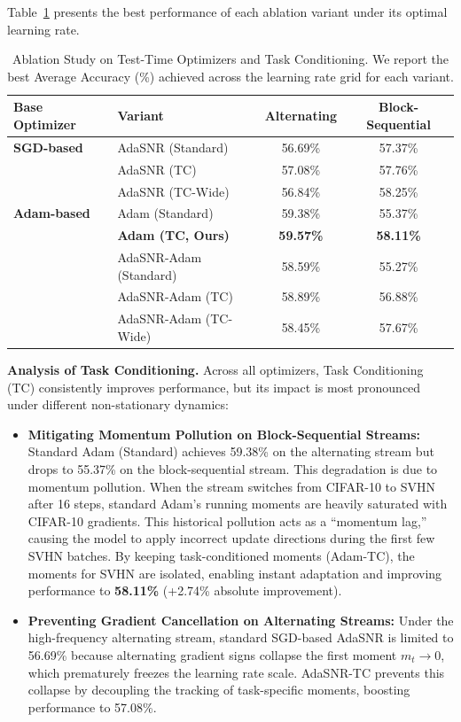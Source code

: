 \documentclass{article}
\theoremstyle{plain}
\theoremstyle{definition}
\theoremstyle{remark}
\begin{document}
Table~\ref{tab:ablation} presents the best performance of each ablation variant under its optimal learning rate.

\begin{table}[t]
\caption{Ablation Study on Test-Time Optimizers and Task Conditioning. We report the best Average Accuracy (\%) achieved across the learning rate grid for each variant.}
\label{tab:ablation}
\vskip 0.15in
\begin{center}
\begin{small}
\begin{tabular}{llcc}
\toprule
\textbf{Base Optimizer} & \textbf{Variant} & \textbf{Alternating} & \textbf{Block-Sequential} \\
\midrule
\textbf{SGD-based} & AdaSNR (Standard) & 56.69\% & 57.37\% \\
 & AdaSNR (TC) & 57.08\% & 57.76\% \\
 & AdaSNR (TC-Wide) & 56.84\% & 58.25\% \\
\midrule
\textbf{Adam-based} & Adam (Standard) & 59.38\% & 55.37\% \\
 & \textbf{Adam (TC, Ours)} & \textbf{59.57\%} & \textbf{58.11\%} \\
 & AdaSNR-Adam (Standard) & 58.59\% & 55.27\% \\
 & AdaSNR-Adam (TC) & 58.89\% & 56.88\% \\
 & AdaSNR-Adam (TC-Wide) & 58.45\% & 57.67\% \\
\bottomrule
\end{tabular}
\end{small}
\end{center}
\vskip -0.1in
\end{table}

\textbf{Analysis of Task Conditioning.} Across all optimizers, Task Conditioning (TC) consistently improves performance, but its impact is most pronounced under different non-stationary dynamics:
\begin{itemize}
    \item \textbf{Mitigating Momentum Pollution on Block-Sequential Streams:} Standard Adam (Standard) achieves 59.38\% on the alternating stream but drops to 55.37\% on the block-sequential stream. This degradation is due to momentum pollution. When the stream switches from CIFAR-10 to SVHN after 16 steps, standard Adam's running moments are heavily saturated with CIFAR-10 gradients. This historical pollution acts as a ``momentum lag,'' causing the model to apply incorrect update directions during the first few SVHN batches. By keeping task-conditioned moments (Adam-TC), the moments for SVHN are isolated, enabling instant adaptation and improving performance to \textbf{58.11\%} (+2.74\% absolute improvement).
    \item \textbf{Preventing Gradient Cancellation on Alternating Streams:} Under the high-frequency alternating stream, standard SGD-based AdaSNR is limited to 56.69\% because alternating gradient signs collapse the first moment $m_t \to 0$, which prematurely freezes the learning rate scale. AdaSNR-TC prevents this collapse by decoupling the tracking of task-specific moments, boosting performance to 57.08\%.
\end{itemize}
\end{document}
